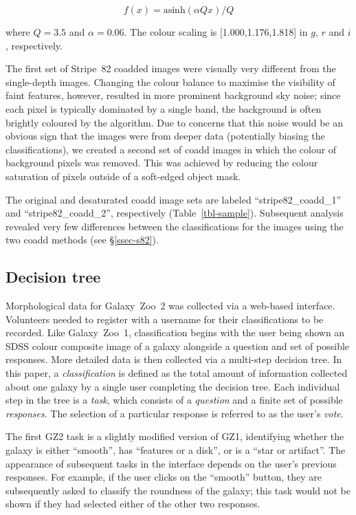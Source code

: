 \documentclass[useAMS,usenatbib]{mn2e}
\begin{document}
\begin{equation}
f(x)=\text{asinh}(\alpha Q x)/Q         %
\label{eqn-imagegen}
\end{equation}

\noindent where $Q=3.5$ and $\alpha=0.06$. The colour scaling is [1.000,1.176,1.818] in $g$, $r$ and $i$, respectively. 

The first set of Stripe~82 coadded images were visually very different from the single-depth images. Changing the colour balance to maximise the visibility of faint features, however, resulted in more prominent background sky noise; since each pixel is typically dominated by a single band, the background is often brightly coloured by the \citet{lup04} algorithm. Due to concerns that this noise would be an obvious sign that the images were from deeper data (potentially biasing the classifications), we created a second set of coadd images in which the colour of background pixels was removed. This was achieved by reducing the colour saturation of pixels outside of a soft-edged object mask. 

The original and desaturated coadd image sets are labeled ``stripe82\_coadd\_1'' and ``stripe82\_coadd\_2'', respectively (Table~\ref{tbl-sample}). Subsequent analysis revealed very few differences between the classifications for the images using the two coadd methods (see \S\ref{ssec-s82}). 

\subsection{Decision tree}\label{ssec-decision_tree}

Morphological data for Galaxy~Zoo~2 was collected via a web-based interface. Volunteers needed to register with a username for their classifications to be recorded. Like Galaxy~Zoo~1, classification begins with the user being shown an SDSS colour composite image of a galaxy alongside a question and set of possible responses. More detailed data is then collected via a multi-step decision tree. In this paper, a {\it classification} is defined as the total amount of information collected about one galaxy by a single user completing the decision tree. Each individual step in the tree is a {\it task}, which consists of a {\it question} and a finite set of possible {\it responses}. The selection of a particular response is referred to as the user's {\it vote}.  

The first GZ2 task is a slightly modified version of GZ1, identifying whether the galaxy is either ``smooth'', has ``features or a disk'', or is a ``star or artifact''. The appearance of subsequent tasks in the interface depends on the user's previous responses. For example, if the user clicks on the ``smooth'' button, they are subsequently asked to classify the roundness of the galaxy; this task would not be shown if they had selected either of the other two responses. 
\end{document}
